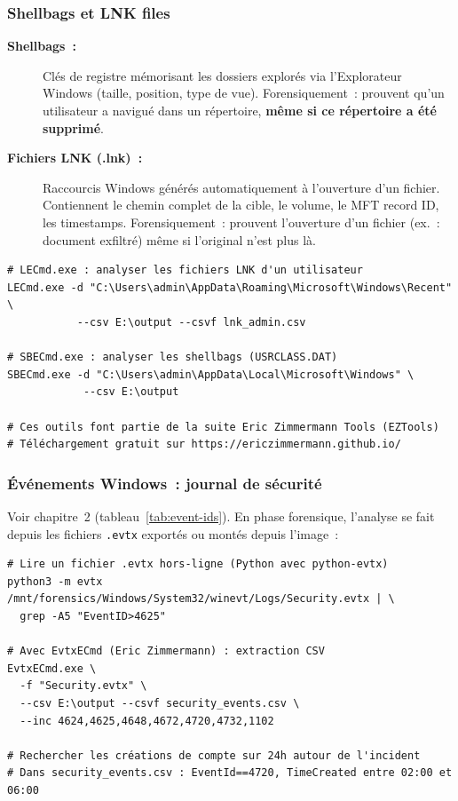 \subsubsection{Shellbags et LNK files}

\begin{description}
  \item[\textbf{Shellbags~:}] Clés de registre mémorisant les dossiers
        explorés via l'Explorateur Windows (taille, position, type de vue).
        Forensiquement~: prouvent qu'un utilisateur a navigué dans un
        répertoire, \textbf{même si ce répertoire a été supprimé}.
  \item[\textbf{Fichiers LNK (.lnk)~:}] Raccourcis Windows générés
        automatiquement à l'ouverture d'un fichier. Contiennent le chemin
        complet de la cible, le volume, le MFT record ID, les timestamps.
        Forensiquement~: prouvent l'ouverture d'un fichier (ex.~: document
        exfiltré) même si l'original n'est plus là.
\end{description}

\begin{lstlisting}[style=StyleTerminal,
  caption={Analyse Shellbags et LNK avec LECmd / SBECmd},
  label={lst:shellbags-lnk}]
# LECmd.exe : analyser les fichiers LNK d'un utilisateur
LECmd.exe -d "C:\Users\admin\AppData\Roaming\Microsoft\Windows\Recent" \
           --csv E:\output --csvf lnk_admin.csv

# SBECmd.exe : analyser les shellbags (USRCLASS.DAT)
SBECmd.exe -d "C:\Users\admin\AppData\Local\Microsoft\Windows" \
            --csv E:\output

# Ces outils font partie de la suite Eric Zimmermann Tools (EZTools)
# Téléchargement gratuit sur https://ericzimmermann.github.io/
\end{lstlisting}

\subsubsection{Événements Windows~: journal de sécurité}

Voir chapitre~2 (tableau~\ref{tab:event-ids}). En phase forensique,
l'analyse se fait depuis les fichiers \texttt{.evtx} exportés ou montés
depuis l'image~:

\begin{lstlisting}[style=StyleTerminal,
  caption={Analyse d'un fichier .evtx hors-ligne},
  label={lst:evtx-offline}]
# Lire un fichier .evtx hors-ligne (Python avec python-evtx)
python3 -m evtx /mnt/forensics/Windows/System32/winevt/Logs/Security.evtx | \
  grep -A5 "EventID>4625"

# Avec EvtxECmd (Eric Zimmermann) : extraction CSV
EvtxECmd.exe \
  -f "Security.evtx" \
  --csv E:\output --csvf security_events.csv \
  --inc 4624,4625,4648,4672,4720,4732,1102

# Rechercher les créations de compte sur 24h autour de l'incident
# Dans security_events.csv : EventId==4720, TimeCreated entre 02:00 et 06:00
\end{lstlisting}

